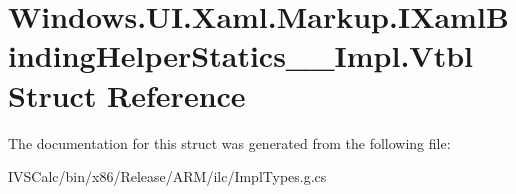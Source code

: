 \hypertarget{struct_windows_1_1_u_i_1_1_xaml_1_1_markup_1_1_i_xaml_binding_helper_statics_____impl_1_1_vtbl}{}\section{Windows.\+U\+I.\+Xaml.\+Markup.\+I\+Xaml\+Binding\+Helper\+Statics\+\_\+\+\_\+\+Impl.\+Vtbl Struct Reference}
\label{struct_windows_1_1_u_i_1_1_xaml_1_1_markup_1_1_i_xaml_binding_helper_statics_____impl_1_1_vtbl}


The documentation for this struct was generated from the following file\+:\begin{DoxyCompactItemize}
\item 
I\+V\+S\+Calc/bin/x86/\+Release/\+A\+R\+M/ilc/Impl\+Types.\+g.\+cs\end{DoxyCompactItemize}
